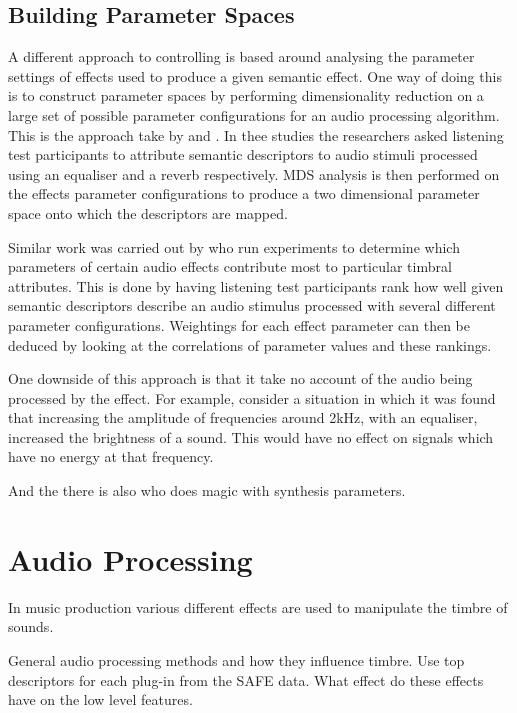 	\subsection{Building Parameter Spaces}
	\label{sec:Timbre-Control-ParameterSpaces}
		A different approach to controlling is based around analysing the parameter settings of effects used to
		produce a given semantic effect. One way of doing this is to construct parameter spaces by performing
		dimensionality reduction on a large set of possible parameter configurations for an audio processing
		algorithm. This is the approach take by \citet{cartwright2013socialeq} and
		\citet{seetharaman2014crowdsourcing}. In thee studies the researchers asked listening test participants to
		attribute semantic descriptors to audio stimuli processed using an equaliser and a reverb respectively. MDS
		analysis is then performed on the effects parameter configurations to produce a two dimensional parameter
		space onto which the descriptors are mapped.

		Similar work was carried out by \citet{sabin2011weighting} who run experiments to determine which
		parameters of certain audio effects contribute most to particular timbral attributes. This is done by
		having listening test participants rank how well given semantic descriptors describe an audio stimulus
		processed with several different parameter configurations. Weightings for each effect parameter can then be
		deduced by looking at the correlations of parameter values and these rankings.

		One downside of this approach is that it take no account of the audio being processed by the effect. For
		example, consider a situation in which it was found that increasing the amplitude of frequencies around
		2kHz, with an equaliser, increased the brightness of a sound. This would have no effect on signals which
		have no energy at that frequency.

		\note
		{
			And the there is also \citet{huang2014active} who does magic with synthesis parameters.
		}

\section{Audio Processing}
\note
{
	In music production various different effects are used to manipulate the timbre of sounds.

	General audio processing methods and how they influence timbre. Use top descriptors for each plug-in from the SAFE
	data. What effect do these effects have on the low level features.
}
